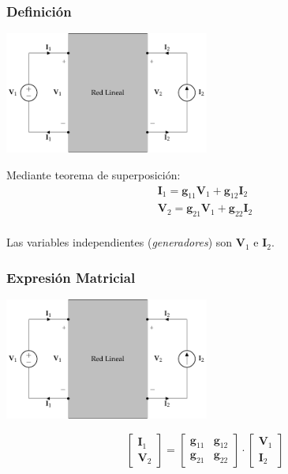 \subsubsection{Definición}
\label{sec:org40235ae}
\begin{center}
\includegraphics[height=4cm]{../figs/cuadripolo_hibrido_inverso.pdf}
\end{center}

Mediante teorema de superposición:
\[
\begin{array}{l}
  \mathbf{I}_1 = \mathbf{g}_{11} \mathbf{V}_1 + \mathbf{g}_{12} \mathbf{I}_2\\
  \mathbf{V}_2 = \mathbf{g}_{21} \mathbf{V}_1 + \mathbf{g}_{22} \mathbf{I}_2\\
\end{array}
\]

Las variables independientes (\emph{generadores}) son \(\mathbf{V}_1\) e \(\mathbf{I}_2\).

\subsubsection{Expresión Matricial}
\label{sec:org5bc2ad0}
\begin{center}
\includegraphics[height=4cm]{../figs/cuadripolo_hibrido_inverso.pdf}
\end{center}

\[
  \left[
    \begin{array}{c}
      \mathbf{I}_1\\
      \mathbf{V}_2
    \end{array}
  \right] =
  \left[
    \begin{array}{cc}
      \mathbf{g}_{11} & \mathbf{g}_{12}\\
      \mathbf{g}_{21} & \mathbf{g}_{22}
    \end{array}
  \right] \cdot
  \left[
    \begin{array}{c}
      \mathbf{V}_1\\
      \mathbf{I}_2
    \end{array}
  \right]
\]

